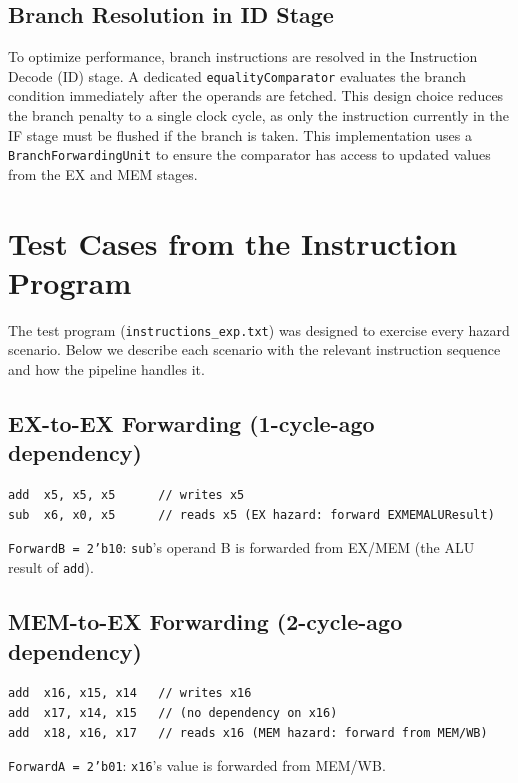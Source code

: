 \documentclass[12pt,a4paper]{article}
\begin{document}
\subsection{Branch Resolution in ID Stage}
To optimize performance, branch instructions are resolved in the Instruction Decode (ID) stage. A dedicated \texttt{equalityComparator} evaluates the branch condition immediately after the operands are fetched. This design choice reduces the branch penalty to a single clock cycle, as only the instruction currently in the IF stage must be flushed if the branch is taken. This implementation uses a \texttt{BranchForwardingUnit} to ensure the comparator has access to updated values from the EX and MEM stages.

\section{Test Cases from the Instruction Program}

The test program (\texttt{instructions\_exp.txt}) was designed to exercise every hazard scenario. Below we describe each scenario with the relevant instruction sequence and how the pipeline handles it.

\subsection{EX-to-EX Forwarding (1-cycle-ago dependency)}
\begin{lstlisting}[style=verilog, numbers=none]
add  x5, x5, x5      // writes x5
sub  x6, x0, x5      // reads x5 (EX hazard: forward EXMEMALUResult)
\end{lstlisting}
\texttt{ForwardB = 2'b10}: \texttt{sub}'s operand B is forwarded from EX/MEM (the ALU result of \texttt{add}).

\subsection{MEM-to-EX Forwarding (2-cycle-ago dependency)}
\begin{lstlisting}[style=verilog, numbers=none]
add  x16, x15, x14   // writes x16
add  x17, x14, x15   // (no dependency on x16)
add  x18, x16, x17   // reads x16 (MEM hazard: forward from MEM/WB)
\end{lstlisting}
\texttt{ForwardA = 2'b01}: \texttt{x16}'s value is forwarded from MEM/WB.
\end{document}
